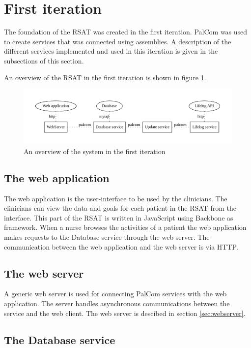 \documentclass{cslthse-msc}
\begin{document}
\section{First iteration}
The foundation of the RSAT was created in the first iteration. PalCom was used to create services that was connected using assemblies. A description of the different services implemented and used in this iteration is given in the subsections of this section. 

An overview of the RSAT in the first iteration is shown in figure \ref{fig:second-version}.


\begin{figure}[!hbt]
\centering
\includegraphics[scale=0.6]{second-version.pdf} 
\caption{An overview of the system in the first iteration}\label{fig:second-version}
\end{figure}

\subsection{The web application}

The web application is the user-interface to be used by the clinicians. The clinicians can view the data and goals for each patient in the RSAT from the interface. This part of the RSAT is written in JavaScript using Backbone as framework. When a nurse browses the activities of a patient the web application makes requests to the Database service through the web server. The communication between the web application and the web server is via HTTP.

\subsection{The web server} %

A generic web server is used for connecting PalCom services with the web application. The server handles asynchronous communications between the service and the web client. The web server is descibed in section \ref{sec:webserver}.


\subsection{The Database service}
\end{document}
